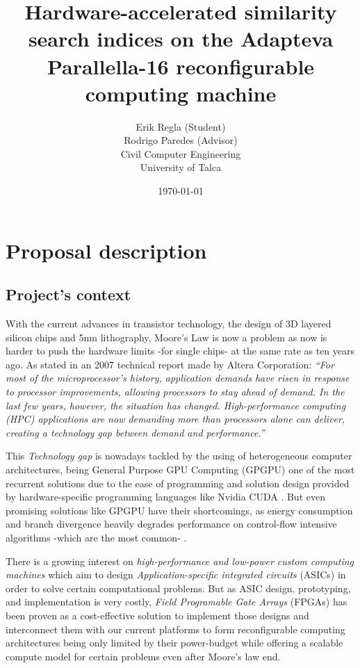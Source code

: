 \documentclass[11pt,letterpaper]{article}
\begin{document}
\pagestyle{empty}

\title{
    Hardware-accelerated similarity search indices on the Adapteva Parallella-16 reconfigurable computing machine
}
\author{
Erik Regla (Student)\\
Rodrigo Paredes (Advisor)\\
Civil Computer Engineering\\ 
University of Talca}
\date{\today}
\maketitle

\section{Proposal description}

\subsection{Project's context} 

    With the current advances in transistor technology, the design of 3D layered silicon chips and 5nm 
    lithography, Moore's Law is now a problem as now is harder to push the hardware limits -for single chips-
    at the same rate as ten years ago\cite{7478302,EETIMES1}. As stated in an 2007 technical report made by Altera
    Corporation: \emph{``For most of the microprocessor's history, application demands have risen in response to 
    processor improvements, allowing processors to stay ahead of demand. In the last few years, however, the 
    situation has changed. High-performance computing (HPC) applications are now demanding more than processors 
    alone can deliver, creating a technology gap between demand and performance.''}\cite{ALTERA_Accel_fpga}


    This \emph{Technology gap} is nowadays tackled by the using of heterogeneous computer architectures, being
    General Purpose GPU Computing (GPGPU) one of the most recurrent solutions due to the ease of programming
    and solution design provided by hardware-specific programming languages like Nvidia CUDA
    \cite{NVIDIA_volta}. But even promising solutions like GPGPU have their shortcomings, as energy consumption
     and branch divergence heavily degrades performance on control-flow intensive algorithms
    -which are the most common- \cite{6376229}.


    There is a growing interest on \emph{high-performance and low-power custom computing machines} which 
    aim to design \emph{Application-specific integrated circuits} (ASICs) in order to solve certain 
    computational problems. But as ASIC design, prototyping, and implementation is very costly,
    \emph{Field Programable Gate Arrays} (FPGAs) has been proven as a cost-effective solution to implement those 
    designs and interconnect them with our current platforms to form reconfigurable computing architectures
    \cite{ReconfigurableComputing, 6589302,Compton00anintroduction} being only limited by their power-budget while offering 
    a scalable compute model for certain problems even after Moore's law end.
\end{document}
